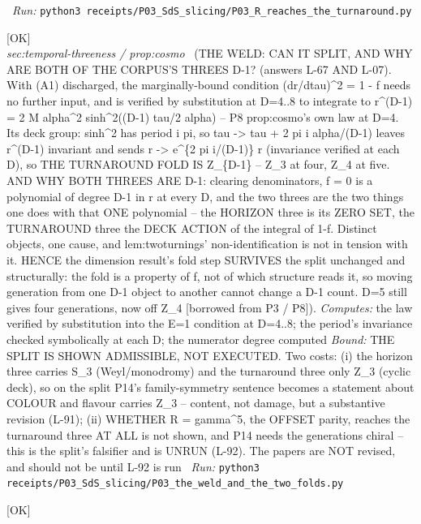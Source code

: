 \begin{description}
\ \emph{Run:} \texttt{python3 receipts/P03\_SdS\_slicing/P03\_R\_reaches\_the\_turnaround.py}
\item[\rcptlabel{P03_the_weld_and_the_two_folds}{P3R37}\textbf{P3R37}\quad\texttt{P03\_the\_weld\_and\_the\_two\_folds}]\hfill\textsf{[OK]}\\
\textit{sec:temporal-threeness / prop:cosmo} \ (THE WELD: CAN IT SPLIT, AND WHY ARE BOTH OF THE CORPUS'S THREES D-1? (answers L-67 AND L-07). With (A1) discharged, the marginally-bound condition (dr/dtau)\textasciicircum{}2 = 1 - f needs no further input, and is verified by substitution at D=4..8 to integrate to r\textasciicircum{}(D-1) = 2 M alpha\textasciicircum{}2 sinh\textasciicircum{}2((D-1) tau/2 alpha) -- P8 prop:cosmo's own law at D=4. Its deck group: sinh\textasciicircum{}2 has period i pi, so tau -> tau + 2 pi i alpha/(D-1) leaves r\textasciicircum{}(D-1) invariant and sends r -> e\textasciicircum{}\{2 pi i/(D-1)\} r (invariance verified at each D), so THE TURNAROUND FOLD IS Z\_\{D-1\} -- Z\_3 at four, Z\_4 at five. AND WHY BOTH THREES ARE D-1: clearing denominators, f = 0 is a polynomial of degree D-1 in r at every D, and the two threes are the two things one does with that ONE polynomial -- the HORIZON three is its ZERO SET, the TURNAROUND three the DECK ACTION of the integral of 1-f. Distinct objects, one cause, and lem:twoturnings' non-identification is not in tension with it. HENCE the dimension result's fold step SURVIVES the split unchanged and structurally: the fold is a property of f, not of which structure reads it, so moving generation from one D-1 object to another cannot change a D-1 count. D=5 still gives four generations, now off Z\_4 [borrowed from P3 / P8]). 
\emph{Computes:} the law verified by substitution into the E=1 condition at D=4..8; the period's invariance checked symbolically at each D; the numerator degree computed
 \emph{Bound:} THE SPLIT IS SHOWN ADMISSIBLE, NOT EXECUTED. Two costs: (i) the horizon three carries S\_3 (Weyl/monodromy) and the turnaround three only Z\_3 (cyclic deck), so on the split P14's family-symmetry sentence becomes a statement about COLOUR and flavour carries Z\_3 -- content, not damage, but a substantive revision (L-91); (ii) WHETHER R = gamma\textasciicircum{}5, the OFFSET parity, reaches the turnaround three AT ALL is not shown, and P14 needs the generations chiral -- this is the split's falsifier and is UNRUN (L-92). The papers are NOT revised, and should not be until L-92 is run
\ \emph{Run:} \texttt{python3 receipts/P03\_SdS\_slicing/P03\_the\_weld\_and\_the\_two\_folds.py}
\item[\rcptlabel{P14_the_isospin_exchange}{P14R22}\textbf{P14R22}\quad\texttt{P14\_the\_isospin\_exchange}]\hfill\textsf{[OK]}\\

\end{description}
